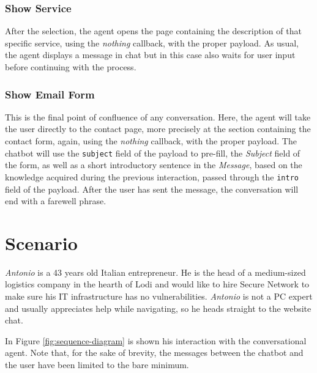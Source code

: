 \documentclass[12pt]{report}
\begin{document}
\subsection{Show Service}
After the selection, the agent opens the page containing the description of 
that specific service, using the \emph{nothing} callback, with the proper payload.
As usual, the agent displays a message in chat but in this case also waits 
for user input before continuing with the process.
\clearpage
\subsection{Show Email Form}
This is the final point of confluence of any conversation.
Here, the agent will take the user directly to the contact page, more
precisely at the section containing the contact form, again, using the \emph{nothing} callback, 
with the proper payload.
The chatbot will use the \texttt{subject} field of the payload 
to pre-fill, the \emph{Subject} field of the form,
as well as a short introductory sentence in the \emph{Message}, based
on the knowledge acquired during the previous interaction, passed through the \texttt{intro} field of the payload.
After the user has sent the message, the conversation will end with a farewell phrase.

\chapter{Scenario}
\emph{Antonio} is a 43 years old Italian entrepreneur. 
He is the head of a medium-sized logistics company in the hearth of Lodi and would like to hire Secure Network to make sure his IT infrastructure has no vulnerabilities.
\emph{Antonio} is not a PC expert and usually appreciates help while navigating, so he heads straight to the website chat.

In Figure \ref{fig:sequence-diagram} is shown his interaction with the conversational agent.
Note that, for the sake of brevity, the messages between the chatbot and the user have been limited to the bare minimum.
\end{document}
